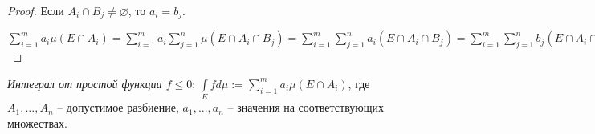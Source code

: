 \begin{proof}
    Если $A_i\cap B_j\not=\varnothing$, то $a_i=b_j$.

    $\sum\limits_{i=1}^m a_i \mu (E\cap A_i)=\sum\limits_{i=1}^m a_i \sum\limits_{j=1}^n \mu (E\cap A_i\cap B_j)=
    \sum\limits_{i=1}^m \sum\limits_{j=1}^n a_i (E\cap A_i\cap B_j)=\sum\limits_{i=1}^m \sum\limits_{j=1}^n b_j (E\cap A_i\cap B_j)=
    \sum\limits_{j=1}^n b_j \mu (E\cap B_j)$
\end{proof}

\begin{definition}
    \textit{Интеграл от простой функции $f\leq 0$}: $\int\limits_E f d\mu := 
    \sum\limits_{i=1}^m a_i \mu (E\cap A_i)$, где $A_1, ..., A_n$ – допустимое разбиение,
    $a_1, ..., a_n$ – значения на соответствующих множествах.
\end{definition}